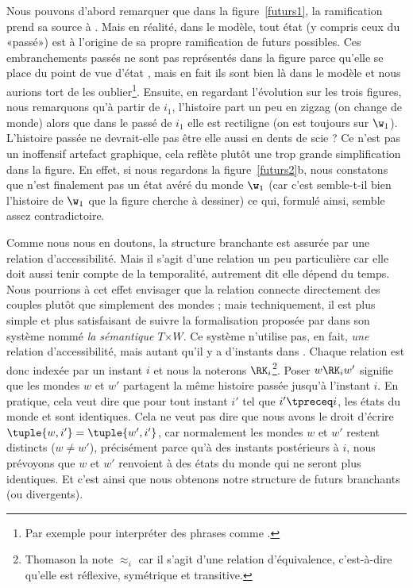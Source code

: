 Nous pouvons d'abord remarquer que dans la figure~\ref{futurs1}, la ramification prend sa source à .   Mais en réalité, dans le modèle, tout état   (y compris ceux du «passé») est à l'origine de sa propre ramification de futurs possibles.
Ces embranchements passés ne sont pas représentés dans la figure parce qu'elle se place du point de vue d'état , mais en fait ils sont bien là dans le modèle et nous aurions tort de les oublier\footnote{Par exemple pour interpréter des phrases comme .}.
Ensuite, en regardant l'évolution sur les trois figures, nous remarquons qu'à partir de $i_1$, l'histoire part un peu en zigzag (on change de monde) alors que dans le passé de $i_1$ elle est rectiligne (on est toujours sur $\w_1$). L'histoire passée ne devrait-elle pas être elle aussi en dents de scie ? Ce n'est pas un inoffensif artefact graphique,  cela reflète plutôt une trop grande simplification dans la figure.  En effet, si nous regardons la figure~\ref{futurs2}b, nous constatons que  n'est finalement pas un état avéré du monde  $\w_1$ (car c'est semble-t-il bien l'histoire de $\w_1$ que la figure cherche à dessiner) ce qui, formulé ainsi, semble assez contradictoire. 

Comme nous nous en doutons, la structure branchante est assurée par une relation d'accessibilité.  Mais il s'agit d'une relation un peu particulière car elle doit aussi tenir compte de la temporalité, autrement dit elle dépend du temps.
Nous pourrions à cet effet envisager que la relation connecte directement des couples  plutôt que simplement des mondes ; mais techniquement, il est plus simple et plus satisfaisant de suivre la formalisation proposée par  \citet{Thomason:84} dans son système nommé \emph{la sémantique $T\mathord{\times}W$}. 
Ce système n'utilise pas, en fait, \emph{une} relation d'accessibilité, mais autant qu'il y a d'instants dans {\Tps}. Chaque relation est donc indexée par un instant $i$ et nous la noterons $\RK_i$\footnote{Thomason la note $\approx_i$ car il s'agit d'une relation d'équivalence, c'est-à-dire qu'elle est réflexive, symétrique et transitive.}. Poser \mbox{$w\RK_i w'$} signifie que les mondes $w$ et $w'$ partagent la même histoire passée jusqu'à l'instant $i$.
En pratique, cela veut dire que pour tout instant $i'$ tel que $i'\tpreceq i$,
les états du monde  et  sont identiques. Cela ne veut pas dire que nous avons le droit d'écrire $\tuple{w,i'}=\tuple{w',i'}$, car normalement les mondes $w$ et $w'$ restent distincts ($w\neq w'$), précisément parce qu'à des instants postérieurs à $i$, nous prévoyons que $w$ et $w'$ renvoient à des états du monde qui ne seront plus identiques. 
Et c'est ainsi que nous obtenons notre structure de futurs branchants (ou divergents).

